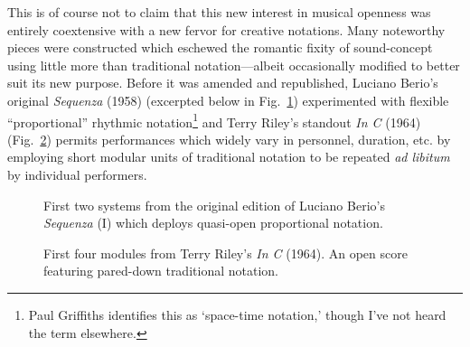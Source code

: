     This is of course not to claim that this new interest in musical openness was entirely coextensive with a new fervor for creative notations. Many noteworthy pieces were constructed which eschewed the romantic fixity of sound-concept using little more than traditional notation---albeit occasionally modified to better suit its new purpose. Before it was amended and republished, Luciano Berio's original \textit{Sequenza} (1958) (excerpted below in Fig.~\ref{fig:sequenza}) experimented with flexible ``proportional'' rhythmic notation\footnote{Paul Griffiths identifies this as `space-time notation,' though I've not heard the term elsewhere.} and Terry Riley's standout \textit{In C} (1964) (Fig.~\ref{fig:inc}) permits performances which widely vary in personnel, duration, etc. by employing short modular units of traditional notation to be repeated \textit{ad libitum} by individual performers.

         \begin{figure}
            \centering
            \captionsetup{width=.5\textwidth}
            \caption[First two systems from the original edition of Luciano Berio's \textit{Sequenza} (I, 1958) which deploys quasi-open proportional notation.]{First two systems from the original edition of Luciano Berio's \textit{Sequenza} (I) which deploys quasi-open proportional notation.\footnotemark}
            \label{fig:sequenza}
        \end{figure}

            \begin{figure}
            \centering
            \captionsetup{width=.5\textwidth}
            \caption[First four modules from Terry Riley's \textit{In C} (1964).]{First four modules from Terry Riley's \textit{In C} (1964). An open score featuring pared-down traditional notation.\footnotemark}
            \label{fig:inc}
        \end{figure}

